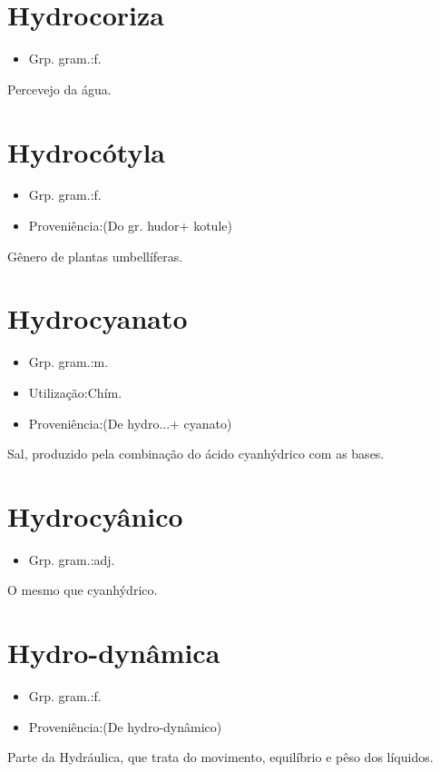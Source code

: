 \documentclass{article}
\begin{document}
\section{Hydrocoriza}
\begin{itemize}
\item {Grp. gram.:f.}
\end{itemize}
Percevejo da água.
\section{Hydrocótyla}
\begin{itemize}
\item {Grp. gram.:f.}
\end{itemize}
\begin{itemize}
\item {Proveniência:(Do gr. \textunderscore hudor\textunderscore  + \textunderscore kotule\textunderscore )}
\end{itemize}
Gênero de plantas umbellíferas.
\section{Hydrocyanato}
\begin{itemize}
\item {Grp. gram.:m.}
\end{itemize}
\begin{itemize}
\item {Utilização:Chím.}
\end{itemize}
\begin{itemize}
\item {Proveniência:(De \textunderscore hydro...\textunderscore  + \textunderscore cyanato\textunderscore )}
\end{itemize}
Sal, produzido pela combinação do ácido cyanhýdrico com as bases.
\section{Hydrocyânico}
\begin{itemize}
\item {Grp. gram.:adj.}
\end{itemize}
O mesmo que \textunderscore cyanhýdrico\textunderscore .
\section{Hydro-dynâmica}
\begin{itemize}
\item {Grp. gram.:f.}
\end{itemize}
\begin{itemize}
\item {Proveniência:(De \textunderscore hydro-dynâmico\textunderscore )}
\end{itemize}
Parte da Hydráulica, que trata do movimento, equilíbrio e pêso dos líquidos.
\end{document}
